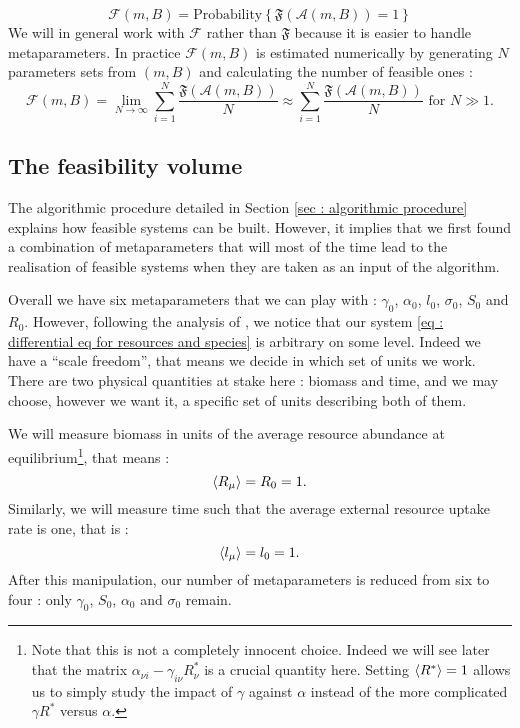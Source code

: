 \documentclass[12pt, titlepage]{report}
\begin{document}
\begin{equation}\boxed{
\mathcal{F}(m, B)=\text{Probability}\left\{\mathfrak{F}\left(\mathcal{A}(m, B)\right)=1\right\}
}
\end{equation}
We will in general work with $\mathcal{F}$ rather than $\mathfrak{F}$ because it is easier to handle metaparameters. In practice $\mathcal{F}(m, B)$ is estimated numerically by generating $N$ parameters sets from $(m,B)$ and calculating the number of feasible ones :
\begin{equation}
\mathcal{F}(m, B) = \lim_{N\rightarrow \infty} \sum_{i=1}^N \frac{\mathfrak{F}(\mathcal{A}(m,B))}{N} \approx \sum_{i=1}^N \frac{\mathfrak{F}(\mathcal{A}(m,B))}{N} \text{ for } N \gg 1.
\end{equation}

\subsection{The feasibility volume}
The algorithmic procedure detailed in Section \ref{sec : algorithmic procedure} explains how feasible systems can be built. However, it implies that we first found a combination of metaparameters that will most of the time lead to the realisation of feasible systems when they are taken as an input of the algorithm.

Overall we have six metaparameters that we can play with : $\gamma_0$, $\alpha_0$, $l_0$, $\sigma_0$, $S_0$ and $R_0$. However, following the analysis of \cite{barbier_cavity_2017}, we notice that our system \eqref{eq : differential eq for resources and species} is arbitrary on some level. Indeed we have a ``scale freedom'', that means we decide in which set of units we work. There are two physical quantities at stake here : biomass and time, and we may choose, however we want it, a specific set of units describing both of them.

We will measure biomass in units of the average resource abundance at equilibrium\footnote{Note that this is not a completely innocent choice. Indeed we will see later that the matrix $\alpha_{\nu i}-\gamma_{i \nu} R^*_\nu$ is a crucial quantity here. Setting $\langle R^* \rangle=1$ allows us to simply study the impact of $\gamma$ against $\alpha$ instead of the more complicated $\gamma R^*$ versus $\alpha$.}, that means :
\begin{equation}
 \langle R_\mu \rangle = R_0 = 1.
\end{equation}
Similarly, we will measure time such that the average external resource uptake rate is one, that is :
\begin{equation}
\langle l_\mu \rangle = l_0 = 1.
\end{equation}
After this manipulation, our number of metaparameters is reduced from six to four : only $\gamma_0$, $S_0$, $\alpha_0$ and $\sigma_0$ remain.
\end{document}
